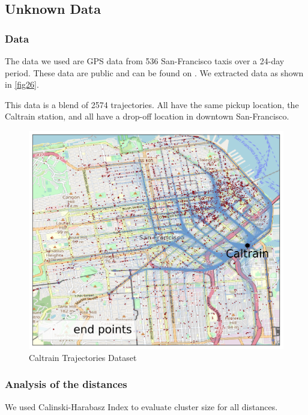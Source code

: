 \documentclass[a4paper, 12pt]{article}
\begin{document}
\subsection{Unknown Data}

\subsubsection{Data}
The data we used are GPS data from 536 San-Francisco taxis over a 24-day period. These data are public and can be found on \cite{piorkowski2009crawdad}. We extracted data as shown in \autoref{fig26}.

This data is a blend of 2574 trajectories. All have the same pickup location, the Caltrain station, and all have a drop-off location in downtown San-Francisco.

\begin{figure}[bp!]
    \centering
    \includegraphics[width=1\textwidth]{caltrain_trajectory_map.png}
    \caption{Caltrain Trajectories Dataset}
    \label{fig33}
\end{figure}

\subsubsection{Analysis of the distances}

We used Calinski-Harabasz Index \citep{calinski1974dendrite} to evaluate cluster size for all distances.
\end{document}
